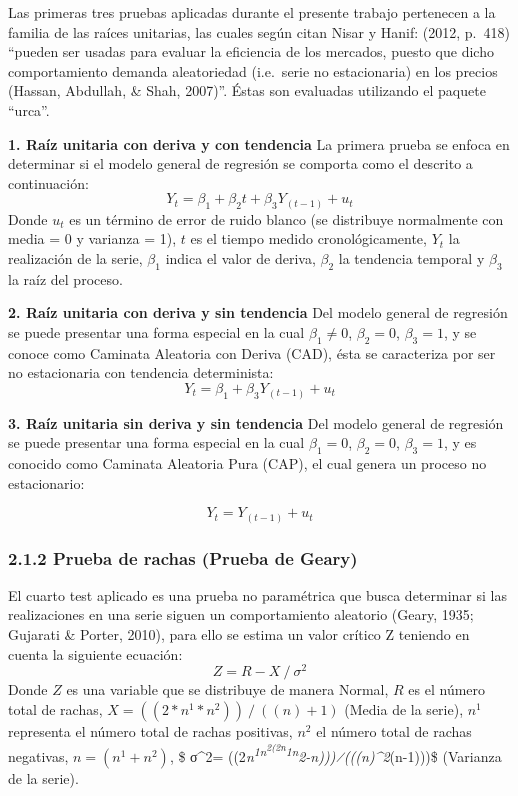 \documentclass[11pt]{article}
\begin{document}
    Las primeras tres pruebas aplicadas durante el presente trabajo
pertenecen a la familia de las raíces unitarias, las cuales según citan
Nisar y Hanif: (2012, p.~418) ``pueden ser usadas para evaluar la
eficiencia de los mercados, puesto que dicho comportamiento demanda
aleatoriedad (i.e.~serie no estacionaria) en los precios (Hassan,
Abdullah, \& Shah, 2007)''. Éstas son evaluadas utilizando el paquete
``urca''.

\textbf{1. Raíz unitaria con deriva y con tendencia} La primera prueba
se enfoca en determinar si el modelo general de regresión se comporta
como el descrito a continuación: \begin{equation*}
Y_t= β_1  + β_2 t + β_3 Y_(t-1)  + u_t
\end{equation*} Donde \(u_t\) es un término de error de ruido blanco (se
distribuye normalmente con media = 0 y varianza = 1), \(t\) es el tiempo
medido cronológicamente, \(Y_t\) la realización de la serie, \(β_1\)
indica el valor de deriva, \(β_2\) la tendencia temporal y \(β_3\) la
raíz del proceso.

\textbf{2. Raíz unitaria con deriva y sin tendencia} Del modelo general
de regresión se puede presentar una forma especial en la cual \(β_1≠0\),
\(β_2=0\), \(β_3=1\), y se conoce como Caminata Aleatoria con Deriva
(CAD), ésta se caracteriza por ser no estacionaria con tendencia
determinista: \begin{equation*}
Y_t= β_1  +  β_3 Y_(t-1)  + u_t
\end{equation*}

\textbf{3. Raíz unitaria sin deriva y sin tendencia} Del modelo general
de regresión se puede presentar una forma especial en la cual \(β_1=0\),
\(β_2=0\), \(β_3=1\), y es conocido como Caminata Aleatoria Pura (CAP),
el cual genera un proceso no estacionario:

\begin{equation*}
Y_t= Y_(t-1)  + u_t
\end{equation*}

    \hypertarget{prueba-de-rachas-prueba-de-geary}{%
\subsubsection{2.1.2 Prueba de rachas (Prueba de
Geary)}\label{prueba-de-rachas-prueba-de-geary}}

    El cuarto test aplicado es una prueba no paramétrica que busca
determinar si las realizaciones en una serie siguen un comportamiento
aleatorio (Geary, 1935; Gujarati \& Porter, 2010), para ello se estima
un valor crítico Z teniendo en cuenta la siguiente ecuación:
\begin{equation*}
Z= R-X⁄σ^2 
\end{equation*} Donde \(Z\) es una variable que se distribuye de manera
Normal, \(R\) es el número total de rachas,
\(X= ((2*n^1*n^2 ))⁄((n)+1)\) (Media de la serie), \(n^1\) representa el
número total de rachas positivas, \(n^2\) el número total de rachas
negativas, \(n= (n^1+n^2 )\), \$ σ\^{}2=
((2\emph{n\textsuperscript{1\emph{n\textsuperscript{2\emph{(2}n}1}n}2-n)))⁄(((n)\^{}2}(n-1)))\$
(Varianza de la serie).
\end{document}
